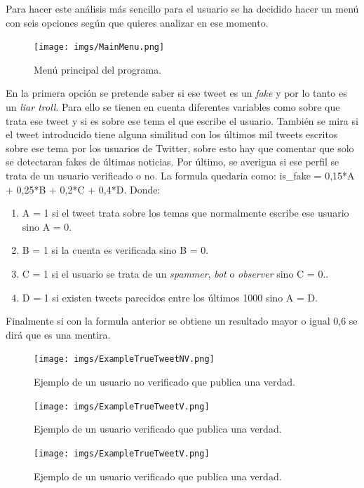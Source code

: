 \documentclass[../all.tex]{subfiles}
\begin{document}
	Para hacer este análisis más sencillo para el usuario se ha decidido hacer un menú con seis opciones según que quieres analizar en ese momento.\\
	
	\begin{figure}[H]
		\centering
		\texttt{[image: imgs/MainMenu.png]}
		\caption{Menú principal del programa.}
	\end{figure}
	
	En la primera opción se pretende saber si ese tweet es un \textit{fake} y por lo tanto es un \textit{liar troll}. Para ello se tienen en cuenta diferentes variables como sobre que trata ese tweet y si es sobre ese tema el que escribe el usuario. También se mira si el tweet introducido tiene alguna similitud con los últimos mil tweets escritos sobre ese tema por los usuarios de Twitter, sobre esto hay que comentar que solo se detectaran fakes de últimas noticias. Por último, se averigua si ese perfil se trata de un usuario verificado o no. La formula quedaria como: is\_fake =  0,15*A + 0,25*B + 0,2*C + 0,4*D. Donde:
	\begin{enumerate}
		\item A = 1 si el tweet trata sobre los temas que normalmente escribe ese usuario sino A = 0.
		\item B = 1 si la cuenta es verificada sino B = 0.
		\item C = 1 si el usuario se trata de un \textit{spammer}, \textit{bot} o \textit{observer} sino C = 0..
		\item D = 1 si existen tweets parecidos entre los últimos 1000 sino A = D.
	\end{enumerate}
	Finalmente si con la formula anterior se obtiene un resultado mayor o igual 0,6 se dirá que es una mentira.
	
	\begin{figure}[H]
		\centering
		\texttt{[image: imgs/ExampleTrueTweetNV.png]}
		\caption{Ejemplo de un usuario no verificado que publica una verdad.}
	\end{figure}
	
	\begin{figure}[H]
		\centering
		\texttt{[image: imgs/ExampleTrueTweetV.png]}
		\caption{Ejemplo de un usuario verificado que publica una verdad.}
	\end{figure}
	
	\begin{figure}[H]
		\centering
		\texttt{[image: imgs/ExampleTrueTweetV.png]}
		\caption{Ejemplo de un usuario verificado que publica una verdad.}
	\end{figure}
	
\end{document}
